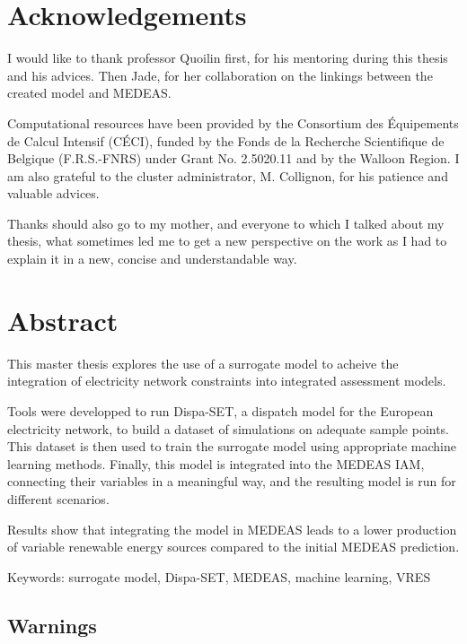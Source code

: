 \section*{Acknowledgements}

I would like to thank professor Quoilin first, for his mentoring during this thesis and his advices. Then Jade, for her collaboration on the linkings between the created model and MEDEAS.

Computational resources have been provided by the Consortium des Équipements de Calcul Intensif (CÉCI), funded by the Fonds de la Recherche Scientifique de Belgique (F.R.S.-FNRS) under Grant No. 2.5020.11 and by the Walloon Region. I am also grateful to the cluster administrator, M. Collignon, for his patience and valuable advices.

Thanks should also go to my mother, and everyone to which I talked about my thesis, what sometimes led me to get a new perspective on the work as I had to explain it in a new, concise and understandable way.

\newpage

\section*{Abstract}

This master thesis explores the use of a surrogate model to acheive the integration of electricity network constraints into integrated assessment models.

Tools were developped to run Dispa-SET, a dispatch model for the European electricity network, to build a dataset of simulations on adequate sample points. This dataset is then used to train the surrogate model using appropriate machine learning methods. Finally, this model is integrated into the MEDEAS IAM, connecting their variables in a meaningful way, and the resulting model is run for different scenarios.

Results show that integrating the model in MEDEAS leads to a lower production of variable renewable energy sources compared to the initial MEDEAS prediction.

\vspace{1cm}
Keywords: surrogate model, Dispa-SET, MEDEAS, machine learning, VRES

\newpage

\tableofcontents

\subsection*{Warnings}

